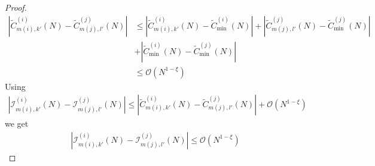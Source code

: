 \documentclass[10pt,a4paper]{amsart}
\begin{document}
\begin{proof}
\begin{align*}
     |\tilde{C}^{(i)}_{m(i),k'}(N)-\tilde{C}^{(j)}_{m(j),l'}(N)|&\leq |\tilde{C}^{(i)}_{m(i),k'}(N)-\tilde{C}^{(i)}_{\min}(N)|+|\tilde{C}^{(j)}_{m(j),l'}(N)-\tilde{C}^{(j)}_{\min}(N)| \\
     &+|\tilde{C}^{(i)}_{\min}(N)-\tilde{C}^{(j)}_{\min}(N)|\\
     & \leq \mathcal{O}(N^{1-\xi})
 \end{align*}
 Using
\begin{align*}
    |\mathcal{I}^{(i)}_{m(i),k'}(N)-\mathcal{I}^{(j)}_{m(j),l'}(N)|\leq  |\tilde{C}^{(i)}_{m(i),k'}(N)-\tilde{C}^{(j)}_{m(j),l'}(N)| + \mathcal{O}(N^{1-\xi})
\end{align*}
we get
\begin{align*}
     |\mathcal{I}^{(i)}_{m(i),k'}(N)-\mathcal{I}^{(j)}_{m(j),l'}(N)| \leq  \mathcal{O}(N^{1-\xi})
\end{align*}






\end{proof}
\end{document}
